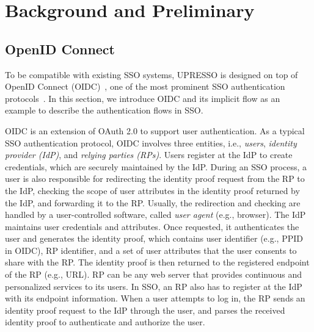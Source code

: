 ﻿\section{Background and Preliminary}
\label{sec:background}


\subsection{OpenID Connect}
\label{subsec:OIDC}

To be compatible with existing SSO systems, UPRESSO is designed on top of OpenID Connect (OIDC)~\cite{OpenIDConnect}, one of the most prominent SSO authentication protocols~\cite{SAMLIdentifier}. In this section, we introduce OIDC and its implicit flow as an example to describe the authentication flows in SSO.

OIDC is an extension of OAuth 2.0 to support user authentication. As a typical SSO authentication protocol, OIDC involves three entities, i.e., {\em users}, {\em identity provider (IdP)}, and {\em relying parties (RPs)}. Users register at the IdP to create credentials, which are securely maintained by the IdP. During an SSO process, a user is also responsible for redirecting the identity proof request from the RP to the IdP, checking the scope of user attributes in the identity proof returned by the IdP, and forwarding it to the RP. Usually, the redirection and checking are handled by a user-controlled software, called {\em user agent} (e.g., browser). The IdP maintains user credentials and attributes. Once requested, it authenticates the user and generates the identity proof, which contains user identifier (e.g., PPID in OIDC), RP identifier, and a set of user attributes that the user consents to share with the RP. The identity proof is then returned to the registered endpoint of the RP (e.g., URL). RP can be any web server that provides continuous and personalized services to its users. In SSO, an RP also has to register at the IdP with its endpoint information. When a user attempts to log in, the RP sends an identity proof request to the IdP through the user, and parses the received identity proof to authenticate and authorize the user.

